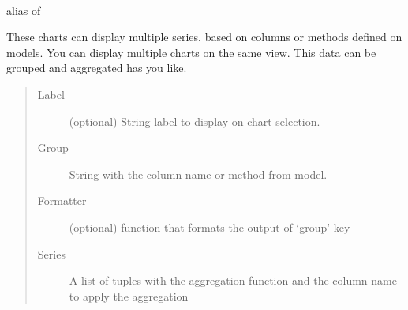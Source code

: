 \documentclass[letterpaper,10pt,english]{sphinxmanual}
\begin{document}
\begin{fulllineitems}
\label{api:flask.ext.appbuilder.charts.views.GroupByChartView}~

\begin{fulllineitems}
\label{api:flask.ext.appbuilder.charts.views.GroupByChartView.ProcessClass}
alias of 

\end{fulllineitems}


\begin{fulllineitems}
\label{api:flask.ext.appbuilder.charts.views.GroupByChartView.definitions}
These charts can display multiple series,
based on columns or methods defined on models.
You can display multiple charts on the same view.
This data can be grouped and aggregated has you like.
\begin{quote}\begin{description}
\item[{Label}] \leavevmode
(optional) String label to display on chart selection.

\item[{Group}] \leavevmode
String with the column name or method from model.

\item[{Formatter}] \leavevmode
(optional) function that formats the output of `group' key

\item[{Series}] \leavevmode
A list of tuples with the aggregation function and the column name
to apply the aggregation

\end{description}\end{quote}


\end{fulllineitems}
\end{fulllineitems}
\end{document}
